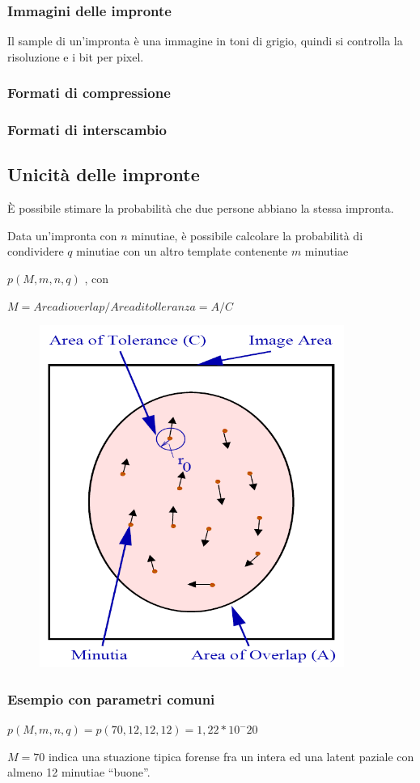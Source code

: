 \subsubsection{Immagini delle impronte}

Il sample di un'impronta è una immagine in toni di grigio, quindi si
controlla la risoluzione e i bit per pixel.

\subsubsection{Formati di compressione}

\subsubsection{Formati di interscambio}


\subsection{Unicità delle impronte}

È possibile stimare la probabilità che due persone abbiano la stessa impronta.

Data un'impronta con $n$ minutiae, è possibile calcolare la probabilità di
condividere $q$ minutiae con un altro template contenente $m$ minutiae

$p(M, m, n, q)$ , con

$M= Area di overlap / Area di tolleranza = A/C$

\begin{figure}[ht]
    \centering
    \includegraphics[width=0.5\linewidth]{images-chap5/unicita.png}
\end{figure}

\subsubsection{Esempio con parametri comuni}

$p(M,m,n,q) = p(70, 12, 12, 12) = 1,22 * 10^-20$

$M=70$ indica una stuazione tipica forense fra un intera ed una latent
paziale con almeno 12 minutiae “buone”.






